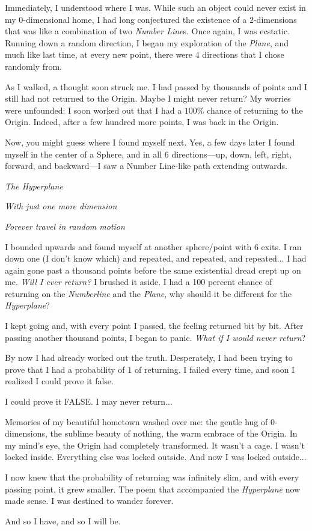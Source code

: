 \documentclass{article}
\begin{document}
Immediately, I understood where I was. While such an object could never exist in my $0$-dimensional home, I had long conjectured the existence of a $2$-dimensions that was like a combination of two \emph{Number Line}s. Once again, I was ecstatic. Running down a random direction, I began my exploration of the \emph{Plane}, and much like last time, at every new point, there were $4$ directions that I chose randomly from.

As I walked, a thought soon struck me. I had passed by thousands of points and I still had not returned to the Origin. Maybe I might never return? My worries were unfounded: I soon worked out that I had a $100$\% chance of returning to the Origin. Indeed, after a few hundred more points, I was back in the Origin. 

Now, you might guess where I found myself next. Yes, a few days later I found myself in the center of a Sphere, and in all $6$ directions---up, down, left, right, forward, and backward---I saw a Number Line-like path extending outwards.

\emph{The Hyperplane}

\emph{
With just one more dimension}

\emph{
Forever travel in random motion
}

I bounded upwards and found myself at another sphere/point with 6 exits. I ran down one (I don't know which) and repeated, and repeated, and repeated... I had again gone past a thousand points before the same existential dread crept up on me. \emph{Will I ever return?} I brushed it aside. I had a 100 percent chance of returning on the \emph{Numberline} and the \emph{Plane}, why should it be different for the \emph{Hyperplane}? 

I kept going and, with every point I passed, the feeling returned bit by bit. After passing another thousand points, I began to panic. \emph{What if I would never return}?

By now I had already worked out the truth. Desperately, I had been trying to prove that I had a probability of $1$ of returning. I failed every time, and soon I realized I could prove it false. 

I could prove it FALSE. I may never return... 

Memories of my beautiful hometown washed over me: the gentle hug of $0$-dimensions, the sublime beauty of nothing, the warm embrace of the Origin. In my mind's eye, the Origin had completely transformed. It wasn't a cage. I wasn't locked inside. Everything else was locked outside. And now I was locked outside...

I now knew that the probability of returning was infinitely slim, and with every passing point, it grew smaller. The poem that accompanied the \emph{Hyperplane} now made sense. I was destined to wander forever.

And so I have, and so I will be. 
\end{document}
